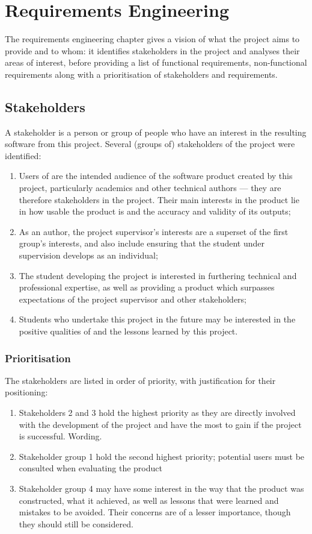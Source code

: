 \chapter{Requirements Engineering}
\label{reqs}
The requirements engineering chapter gives a vision of what the project aims to provide and to whom: it identifies stakeholders in the project and analyses their areas of interest, before providing a list of functional requirements, non-functional requirements along with a prioritisation of stakeholders and requirements.

\section{Stakeholders}
A stakeholder is a person or group of people who have an interest in the resulting software from this project.  Several (groups of) stakeholders of the project were identified:

\begin{enumerate}
	\item Users of \bibtex{} are the intended audience of the software product created by this project, particularly academics and other technical authors --- they are therefore stakeholders in the project.  Their main interests in the product lie in how usable the product is and the accuracy and validity of its outputs;
	\item As an author, the project supervisor's interests are a superset of the first group's interests, and also include ensuring that the student under supervision develops as an individual;
	\item The student developing the project is interested in furthering technical and professional expertise, as well as providing a product which surpasses expectations of the project supervisor and other stakeholders;
	\item Students who undertake this project in the future may be interested in the positive qualities of and the lessons learned by this project.
\end{enumerate}

\subsection*{Prioritisation}
The stakeholders are listed in order of priority, with justification for their positioning:
\begin{enumerate}
	\item Stakeholders 2 and 3 hold the highest priority as they are directly involved with the development of the project and have the most to gain if the project is successful. \revisit Wording.
	\item Stakeholder group 1 hold the second highest priority; potential users must be consulted when evaluating the product
	\item Stakeholder group 4 may have some interest in the way that the product was constructed, what it achieved, as well as lessons that were learned and mistakes to be avoided.  Their concerns are of a lesser importance, though they should still be considered.
\end{enumerate}

